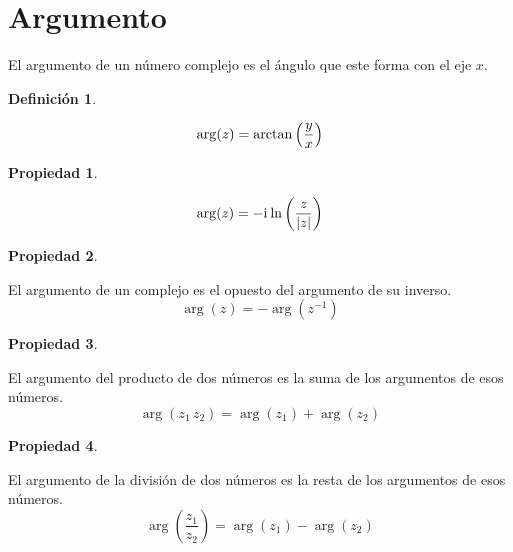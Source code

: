 \documentclass[a5paper,12pt,twoside]{book}
\newtheorem{defn}{{Definición}}[chapter]
\newtheorem{prop}{{Propiedad}}[chapter]
\begin{document}
\section{Argumento}

El argumento de un número complejo es el ángulo que este forma con el eje $x$.

\begin{mdframed}[style=MyFrame1]
    \begin{defn}
    \end{defn}
    \begin{equation*}
        \arg(z) = \arctan \left(\frac{y}{x}\right)
    \end{equation*}
\end{mdframed}

\begin{mdframed}[style=MyFrame1]
    \begin{prop}
    \end{prop}
    \begin{equation*}
        \arg(z) = - \mathrm{i}\mkern1mu \ln \left( \frac{z}{{\left| {z} \right|}} \right)
    \end{equation*}
\end{mdframed}

\begin{mdframed}[style=MyFrame1]
    \begin{prop}
    \end{prop}
    El argumento de un complejo es el opuesto del argumento de su inverso.
    \begin{equation*}
        \arg(z) = - \arg(z^{-1})
    \end{equation*}
\end{mdframed}

\begin{mdframed}[style=MyFrame1]
    \begin{prop}
    \end{prop}
    El argumento del producto de dos números es la suma de los argumentos de esos números.
    \begin{equation*}
        \arg (z_1 \, z_2) = \arg(z_1) + \arg(z_2)
    \end{equation*}
\end{mdframed}

\begin{mdframed}[style=MyFrame1]
    \begin{prop}
    \end{prop}
    El argumento de la división de dos números es la resta de los argumentos de esos números.
    \begin{equation*}
        \arg \left( \dfrac{z_1}{z_2} \right) = \arg(z_1) - \arg(z_2)
    \end{equation*}
\end{mdframed}
\end{document}
